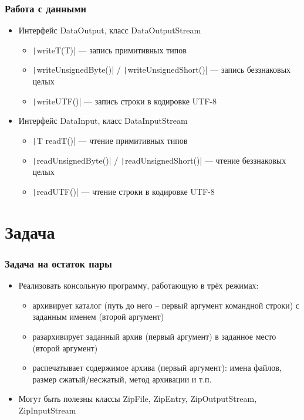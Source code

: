 \documentclass[xetex,mathserif,serif]{beamer}
\begin{document}
	\begin{frame}
		\frametitle{Работа с данными}
		\begin{itemize}
			\item Интерфейс DataOutput, класс DataOutputStream
			\begin{itemize}
				\item \texttt|writeT(T)| --- запись примитивных типов
				\item \texttt|writeUnsignedByte()| / \texttt|writeUnsignedShort()| --- запись беззнаковых целых
				\item \texttt|writeUTF()| --- запись строки в кодировке UTF-8
			\end{itemize}
			\item Интерфейс DataInput, класс DataInputStream
			\begin{itemize}
				\item \texttt|T readT()| --- чтение примитивных типов
				\item \texttt|readUnsignedByte()| / \texttt|readUnsignedShort()| --- чтение беззнаковых целых
				\item \texttt|readUTF()| --- чтение строки в кодировке UTF-8
			\end{itemize}
		\end{itemize}
	\end{frame}

	\section{Задача}

	\begin{frame}
		\frametitle{Задача на остаток пары}
		\begin{itemize}
			\item Реализовать консольную программу, работающую в трёх режимах:
			\begin{itemize}
				\item архивирует каталог (путь до него -- первый аргумент командной строки) с заданным именем (второй аргумент)
				\item разархивирует заданный архив (первый аргумент) в заданное место (второй аргумент)
				\item распечатывает содержимое архива (первый аргумент): имена файлов, размер сжатый/несжатый, метод архивации и т.п.
			\end{itemize}
			\item Могут быть полезны классы ZipFile, ZipEntry, ZipOutputStream, ZipInputStream
		\end{itemize}
	\end{frame}
\end{document}

